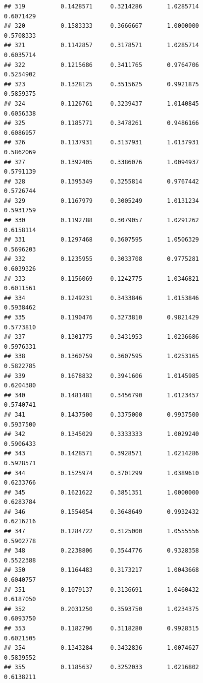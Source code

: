 \documentclass[]{article}
\begin{document}
\begin{verbatim}
## 319          0.1428571     0.3214286       1.0285714          0.6071429
## 320          0.1583333     0.3666667       1.0000000          0.5708333
## 321          0.1142857     0.3178571       1.0285714          0.6035714
## 322          0.1215686     0.3411765       0.9764706          0.5254902
## 323          0.1328125     0.3515625       0.9921875          0.5859375
## 324          0.1126761     0.3239437       1.0140845          0.6056338
## 325          0.1185771     0.3478261       0.9486166          0.6086957
## 326          0.1137931     0.3137931       1.0137931          0.5862069
## 327          0.1392405     0.3386076       1.0094937          0.5791139
## 328          0.1395349     0.3255814       0.9767442          0.5726744
## 329          0.1167979     0.3005249       1.0131234          0.5931759
## 330          0.1192788     0.3079057       1.0291262          0.6158114
## 331          0.1297468     0.3607595       1.0506329          0.5696203
## 332          0.1235955     0.3033708       0.9775281          0.6039326
## 333          0.1156069     0.1242775       1.0346821          0.6011561
## 334          0.1249231     0.3433846       1.0153846          0.5938462
## 335          0.1190476     0.3273810       0.9821429          0.5773810
## 337          0.1301775     0.3431953       1.0236686          0.5976331
## 338          0.1360759     0.3607595       1.0253165          0.5822785
## 339          0.1678832     0.3941606       1.0145985          0.6204380
## 340          0.1481481     0.3456790       1.0123457          0.5740741
## 341          0.1437500     0.3375000       0.9937500          0.5937500
## 342          0.1345029     0.3333333       1.0029240          0.5906433
## 343          0.1428571     0.3928571       1.0214286          0.5928571
## 344          0.1525974     0.3701299       1.0389610          0.6233766
## 345          0.1621622     0.3851351       1.0000000          0.6283784
## 346          0.1554054     0.3648649       0.9932432          0.6216216
## 347          0.1284722     0.3125000       1.0555556          0.5902778
## 348          0.2238806     0.3544776       0.9328358          0.5522388
## 350          0.1164483     0.3173217       1.0043668          0.6040757
## 351          0.1079137     0.3136691       1.0460432          0.6187050
## 352          0.2031250     0.3593750       1.0234375          0.6093750
## 353          0.1182796     0.3118280       0.9928315          0.6021505
## 354          0.1343284     0.3432836       1.0074627          0.5839552
## 355          0.1185637     0.3252033       1.0216802          0.6138211

\end{verbatim}
\end{document}
